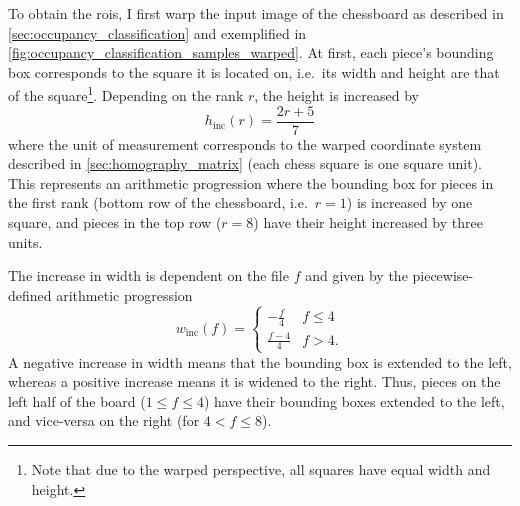 \documentclass[../report.tex]{subfiles}
\begin{document}
To obtain the \glspl{roi}, I first warp the input image of the chessboard as described in \cref{sec:occupancy_classification} and exemplified in \cref{fig:occupancy_classification_samples_warped}.
At first, each piece's bounding box corresponds to the square it is located on, i.e.\ its width and height are that of the square\footnote{Note that due to the warped perspective, all squares have equal width and height.}.
Depending on the rank $r$, the height is increased by
\begin{equation*}
    h_\text{inc}(r) = \frac{2r + 5}{7}
\end{equation*}
where the unit of measurement corresponds to the warped coordinate system described in \cref{sec:homography_matrix} (each chess square is one square unit).
This represents an arithmetic progression where the bounding box for pieces in the first rank (bottom row of the chessboard, i.e.\ $r=1$) is increased by one square, and pieces in the top row ($r=8$) have their height increased by three units.

The increase in width is dependent on the file $f$ and given by the piecewise-defined arithmetic progression
\begin{equation*}
    w_\text{inc}(f) = \begin{cases}
        -\frac{f}{4} & f \leq 4 \\
        \frac{f-4}{4} & f > 4.
    \end{cases}
\end{equation*}
A negative increase in width means that the bounding box is extended to the left, whereas a positive increase means it is widened to the right.
Thus, pieces on the left half of the board ($1 \leq f \leq 4$) have their bounding boxes extended to the left, and vice-versa on the right (for $4 < f \leq 8$).
\end{document}
